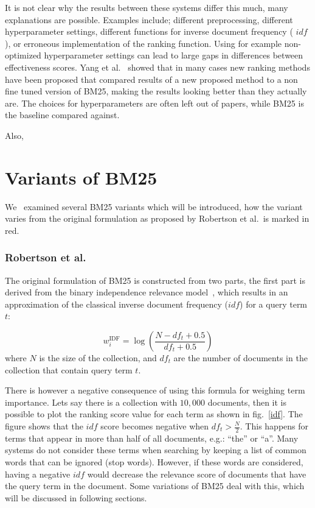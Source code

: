 It is not clear why the results between these systems differ this much, many explanations are possible. Examples include; different preprocessing, different hyperparameter settings, different functions for inverse document frequency ( $idf$ ), or erroneous implementation of the ranking function. Using for example non-optimized hyperparameter settings can lead to large gaps in differences between effectiveness scores. Yang et al.~\cite{weak-baselines} showed that in many cases new ranking methods have been proposed that compared results of a new proposed method to a non fine tuned version of BM25, making the results looking better than they actually are. The choices for hyperparameters are often left out of papers, while BM25 is the baseline compared against.
 
Also, 

\section{Variants of BM25}
We~\cite{Kamphuis2020BM25} examined several BM25 variants which will be introduced, how the variant varies from the original formulation as proposed by Robertson et al.~is marked in red. 

\subsubsection{Robertson et al.~\cite{bm25-robertson}} 
The original formulation of BM25 is constructed from two parts, the first part is derived from the binary independence relevance model~\cite{bm25-beyond}, which results in an approximation of the classical inverse document frequency ($ idf $) for a query term $t$:

\begin{equation} 
	w_i^{\text{IDF}} = \log\left(\frac{N-df_t+0.5}{df_t+0.5}\right)
\end{equation}
where $N$ is the size of the collection, and $df_t$ are the number of documents in the collection that contain query term $t$. 

There is however a negative consequence of using this formula for weighing term importance. Lets say there is a collection with $10,000$ documents, then it is possible to plot the ranking score value for each term as shown in fig.~\ref{idf}. The figure shows that the $ idf $ score becomes negative when $df_t > \frac{N}{2}$. This happens for terms that appear in more than half of all documents, e.g.: ``the'' or ``a''. Many systems do not consider these terms when searching by keeping a list of common words that can be ignored (stop words). However, if these words are considered, having a negative $ idf $ would decrease the relevance score of documents that have the query term in the document. Some variations of BM25 deal with this, which will be discussed in following sections. 
 

